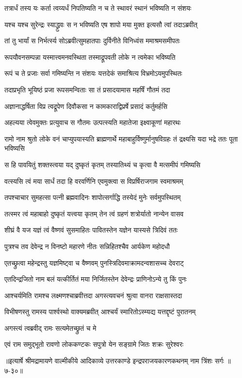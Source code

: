 \twolineshloka
{तत्रार्धं तस्य यः कर्ता त्वय्यर्धं निपतिष्यति}
{न च ते स्थावरं स्थानं भविष्यति न संशयः} %

\twolineshloka
{यश्च यश्च सुरेन्द्रः स्याद्ध्रुवः स न भविष्यति}
{एष शापो मया मुक्त इत्यसौ त्वां तदाऽब्रवीत्} %

\twolineshloka
{तां तु भार्यां स निर्भर्त्स्य सोऽब्रवीत्सुमहातपाः}
{दुर्विनीते विनिध्वंस ममाश्रमसमीपतः} %

\twolineshloka
{रूपयौवनसम्पन्ना यस्मात्त्वमनवस्थिता}
{तस्माद्रूपवती लोके न त्वमेका भविष्यति} %

\twolineshloka
{रूपं च ते प्रजाः सर्वा गमिष्यन्ति न संशयः}
{यत्तदेकं समाश्रित्य विभ्रमोऽयमुपस्थितः} %

\twolineshloka
{तदाप्रभृति भूयिष्ठं प्रजा रूपसमन्विताः}
{सा तं प्रसादयामास महर्षिं गौतमं तदा} %

\twolineshloka
{अज्ञानाद्धर्षिता विप्र त्वद्रूपेण दिवौकसा}
{न कामकाराद्विप्रर्षे प्रसादं कर्तुमर्हसि} %

\twolineshloka
{अहल्यया त्वेवमुक्तः प्रत्युवाच स गौतमः}
{उत्पत्स्यति महातेजा इक्ष्वाकूणां महारथः} %

\threelineshloka
{रामो नाम श्रुतो लोके वनं चाप्युपयास्यति}
{ब्राह्मणार्थे महाबाहुर्विष्णुर्मानुषविग्रहः}
{तं द्रक्ष्यसि यदा भद्रे ततः पूता भविष्यसि} %

\twolineshloka
{स हि पावयितुं शक्तस्त्वया यद् दुष्कृतं कृतम्}
{तस्यातिथ्यं च कृत्वा वै मत्समीपं गमिष्यसि} %

\twolineshloka
{वत्स्यसि त्वं मया सार्धं तदा हि वरवर्णिनि}
{एवमुक्त्वा स विप्रर्षिराजगाम स्वमाश्रमम्} %

\twolineshloka
{तपश्चाचार सुमहत्सा पत्नी ब्रह्मवादिनः}
{शापोत्सर्गाद्धि तस्येदं मुनेः सर्वमुपस्थितम्} %

\twolineshloka
{तत्स्मर त्वं महाबाहो दुष्कृतं यत्त्वया कृतम्}
{तेन त्वं ग्रहणं शत्रोर्यातो नान्येन वासव} %

\twolineshloka
{शीघ्रं वै यज यज्ञं त्वं वैष्णवं सुसमाहितः}
{पावितस्तेन यज्ञेन यास्यसे त्रिदिवं ततः} %

\twolineshloka
{पुत्रश्च तव देवेन्द्र न विनष्टो महारणे}
{नीतः सन्निहितश्चैव आर्यकेण महोदधौ} %

\twolineshloka
{एतच्छ्रुत्वा महेन्द्रस्तु यज्ञमिष्ट्वा च वैष्णवम्}
{पुनस्त्रिदिवमाक्रामदन्वशासच्च देवराट्} %

\twolineshloka
{एतदिन्द्रजितो नाम बलं यत्कीर्तितं मया}
{निर्जितस्तेन देवेन्द्रः प्राणिनोऽन्ये तु किं पुनः} %

\twolineshloka
{आश्चर्यमिति रामश्च लक्ष्मणश्चाब्रवीत्तदा}
{अगस्त्यवचनं श्रुत्वा वानरा राक्षसास्तदा} %

\twolineshloka
{विभीषणस्तु रामस्य पार्श्वस्थो वाक्यमब्रवीत्}
{आश्चर्यं स्मारितोऽस्म्यद्य यत्तद्दृष्टं पुरातनम्} %

\onelineshloka
{अगस्त्यं त्वब्रवीद् रामः सत्यमेतच्छ्रुतं च मे} %

\twolineshloka
{एवं राम समुद्भूतो रावणो लोककण्टकः}
{सपुत्रो येन सङ्ग्रामे जितः शक्रः सुरेश्वरः} %


॥इत्यार्षे श्रीमद्रामायणे वाल्मीकीये आदिकाव्ये उत्तरकाण्डे इन्द्रपराजयकारणकथनम् नाम त्रिंशः सर्गः ॥७-३०॥
